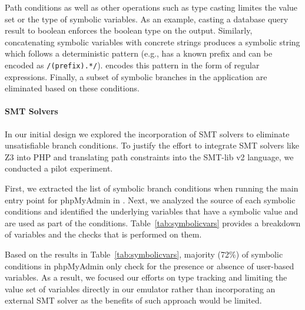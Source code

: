 Path conditions as well as other operations such as type casting limites the value set or the type of symbolic variables. 
As an example, casting a database query result to boolean enforces the boolean type on the output. 
Similarly, concatenating symbolic variables with concrete strings produces a symbolic string which follows a deterministic pattern (e.g., has a known prefix and can be encoded as \texttt{/(prefix).*/}). 
\sys{} encodes this pattern in the form of regular expressions. 
Finally, a subset of symbolic branches in the application are eliminated based on these conditions. 

\paragraph{SMT Solvers}
In our initial design we explored the incorporation of SMT solvers to eliminate unsatisfiable branch conditions. 
To justify the effort to integrate SMT solvers like Z3 into PHP and translating path constraints into the SMT-lib v2 language, we conducted a pilot experiment. 

First, we extracted the list of symbolic branch conditions when running the main entry point for phpMyAdmin in \sys{}. 
Next, we analyzed the source of each symbolic conditions and identified the underlying variables that have a symbolic value and are used as part of the conditions. 
Table~\ref{tab:symbolicvars} provides a breakdown of variables and the checks that is performed on them. 

Based on the results in Table~\ref{tab:symbolicvars}, majority (72\%) of symbolic conditions in phpMyAdmin only check for the presence or absence of user-based variables. 
As a result, we focused our efforts on type tracking and limiting the value set of variables directly in our emulator rather than incorporating an external SMT solver as the benefits of such approach would be limited. 


